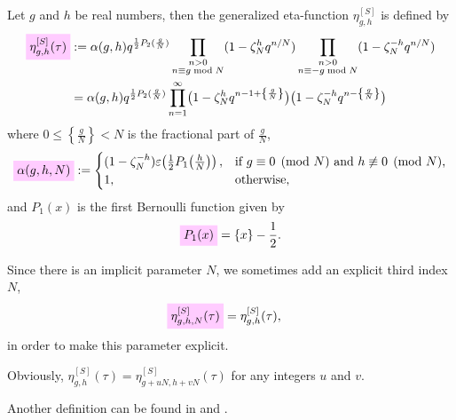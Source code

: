 \documentclass{article}
\begin{document}
\begin{Definition}
  \cite{Schoeneberg:EllipticModularFunctions:1974} Let $g$ and $h$ be
  real numbers, then the generalized eta-function $\eta_{g,h}^{[S]}$
  is defined by
\begin{align}
  \defineNotation[eta-g-h-tau-Schoeneberg]{\eta_{g,h}^{[S]}(\tau)}
  &:=
  \alpha(g,h) q^{\frac{1}{2} P_2(\frac{g}{N})}
  \prod_{\substack{n>0\\n\equiv g \bmod N}}
       (1-\zeta_N^h q^{n/N})
  \prod_{\substack{n>0\\n\equiv -g \bmod N}}
       (1-\zeta_N^{-h} q^{n/N})
  \notag\\
  &=
  \alpha(g,h) q^{\frac{1}{2} P_2(\frac{g}{N})}
  \prod_{n=1}^\infty
    \bigl(1-\zeta_N^h q^{n-1 + \left\{\frac{g}{N}\right\}}\bigr)
    \bigl(1-\zeta_N^{-h} q^{n - \left\{\frac{g}{N}\right\}}\bigr)
  \label{eq:eta_g-h^[S](tau)}
\end{align}
where $0\le\left\{\frac{g}{N}\right\}<N$ is the fractional part of
$\frac{g}{N}$,
\begin{gather}
  \defineNotation[alpha-g-h-N]{\alpha(g,h,N)}
  :=
  \begin{cases}
    (1 - \zeta_N^{-h}) \unityPower{\frac{1}{2} P_1\!\left(\frac{h}{N}\right)},
    &
    \text{if $g\equiv0\pmod{N}$ and $h\not\equiv0\pmod{N}$,}
    \\
    1, & \text{otherwise},
  \end{cases}
  \label{eq:eta_g-h^[S](tau)-prefactor}
\end{gather}
and $P_1(x)$ is the first Bernoulli function given by
\begin{gather*}
  \defineNotation[P-1]{P_1(x)}
  =
  \{x\} - \frac{1}{2}.
\end{gather*}

Since there is an implicit parameter $N$, we sometimes add an explicit
third index $N$, \ie
\begin{align}
  \label{eq:eta_g-h-N^[S](tau)}
  \defineNotation[eta-g-h-N-tau-Schoeneberg]{\eta_{g,h,N}^{[S]}(\tau)}
  &=
  \eta_{g,h}^{[S]}(\tau),
\end{align}
in order to make this parameter explicit.
\end{Definition}

Obviously, $\eta_{g,h}^{[S]}(\tau) = \eta_{g+uN,h+vN}^{[S]}(\tau)$ for
any integers $u$ and $v$.

Another definition can be found in
\cite{Robins:GeneralizedDedekindEtaProducts:1994} and
\cite{Chen+Du+Zhao:FindingModularFunctionsRamanujan:2019}.
\end{document}
